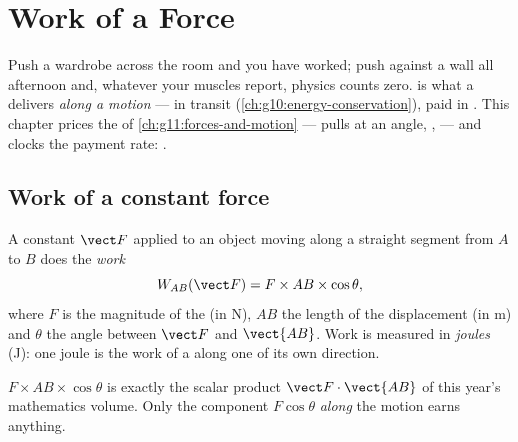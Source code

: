 \chapter{Work of a Force}\label{ch:g11:work-of-force}

Push a wardrobe across the room and you have worked; push against a
wall all afternoon and, whatever your muscles report, physics counts
zero.  is what a  delivers \emph{along a motion} --- 
in transit (\cref{ch:g10:energy-conservation}), paid in . This
chapter prices the  of \cref{ch:g11:forces-and-motion} --- pulls
at an angle, ,  --- and clocks the payment rate: .

\section{Work of a constant force}

\begin{definition}\label{def:g11:work-of-force:work}
A constant  $\vect F$ applied to an object moving along a straight
segment from $A$ to $B$ does the \emph{work}
\[
W_{AB}(\vect F) = F \times AB \times \cos\theta ,
\]
where $F$ is the magnitude of the  (in \unit{N}), $AB$ the length
of the displacement (in \unit{m}) and $\theta$ the angle between
$\vect F$ and $\vect{AB}$. Work is measured in
\emph{joules} (\unit{J}): one joule is the work of a
  along one  of its own direction.
\end{definition}

\begin{remark}\label{rem:g11:work-of-force:scal}
$F \times AB \times \cos\theta$ is exactly the scalar product
$\vect F \cdot \vect{AB}$ of this year's mathematics volume. Only the
component $F\cos\theta$ \emph{along} the motion earns anything.
\end{remark}

